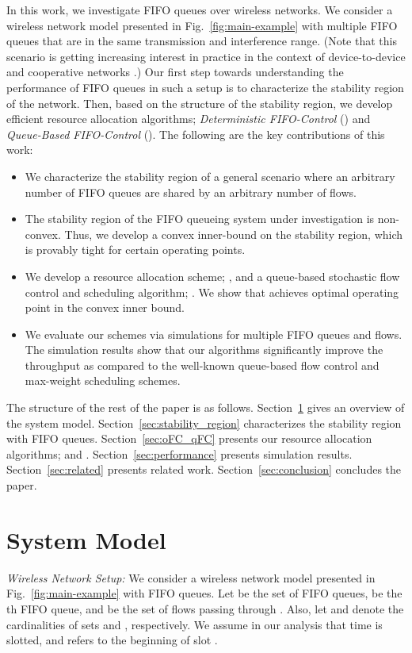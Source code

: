 \documentclass[conference]{IEEEtran}
\begin{document}
In this work, we investigate FIFO queues over wireless networks. We consider a wireless network model presented in Fig.~\ref{fig:main-example} with multiple FIFO queues that are in the same transmission and interference range. (Note that this scenario is getting increasing interest in practice in the context of device-to-device and cooperative networks \cite{microcast}.) 
Our first step towards understanding the performance of FIFO queues in such a setup is to characterize the stability region of the network. Then, based on the structure of the stability region, we develop efficient resource allocation algorithms; {\em Deterministic FIFO-Control} () and {\em Queue-Based FIFO-Control} (). The following are the key contributions of this work:
\begin{itemize}
\item We characterize the stability region of a general scenario where an arbitrary number of FIFO queues are shared by an arbitrary number of flows.
\item The stability region of the FIFO queueing system under investigation is non-convex. Thus, we develop a convex inner-bound on the stability region, which is provably tight for certain operating points.
\item We develop a resource allocation scheme; , and a queue-based stochastic flow control and scheduling algorithm; . We show that  achieves optimal operating point in the convex inner bound.
\item We evaluate our schemes via simulations for multiple FIFO queues and flows. The simulation results show that our algorithms significantly improve the throughput as compared to the well-known queue-based flow control and max-weight scheduling schemes.
\end{itemize}

The structure of the rest of the paper is as follows. Section~\ref{sec:system} gives an overview of the system model. Section~\ref{sec:stability_region} characterizes the stability region with FIFO queues. Section~\ref{sec:oFC_qFC} presents our resource allocation algorithms;  and . Section~\ref{sec:performance} presents simulation results. Section~\ref{sec:related} presents related work. Section~\ref{sec:conclusion} concludes the paper.


\section{System Model}\label{sec:system}
{\em Wireless Network Setup:}
We consider a wireless network model presented in Fig.~\ref{fig:main-example} with  FIFO queues. Let  be the set of FIFO queues,  be the th FIFO queue, and  be the set of flows passing through . Also, let  and  denote the cardinalities of sets  and , respectively. We assume in our analysis that time is slotted, and  refers to the beginning of slot .
\end{document}
